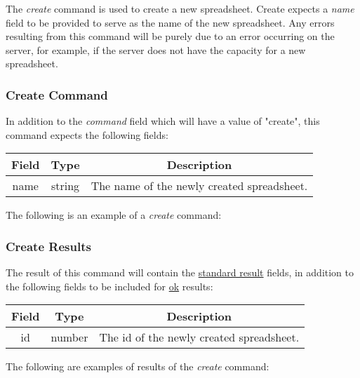 The \emph{create} command is used to create a new spreadsheet. Create expects a \emph{name} 
field to be provided to serve as the name of the new spreadsheet. Any errors 
resulting from this command will be purely due to an error occurring on the 
server, for example, if the server does not have the capacity for a new 
spreadsheet.

\subsubsection{Create Command}

In addition to the \emph{command} field which will have a value of "create", this command expects the following fields:
\begin{table}[H]
    \begin{center}
        \begin{tabular}{|c|c|c|}\hline
            Field & Type & Description \\\hline
            name & string & The name of the newly created spreadsheet. \\\hline
        \end{tabular}
    \end{center}
\end{table}

The following is an example of a \emph{create} command:


\subsubsection{Create Results}
The result of this command will contain the \hyperref[sec:message:result]{standard result} fields, in addition to the following fields to be included for \underline{ok} results:
\begin{table}[H]
    \begin{center}
        \begin{tabular}{|c|c|c|}\hline
            Field & Type & Description \\\hline
            id & number & The id of the newly created spreadsheet. \\\hline
        \end{tabular}
    \end{center}
\end{table}

The following are examples of results of the \emph{create} command:




